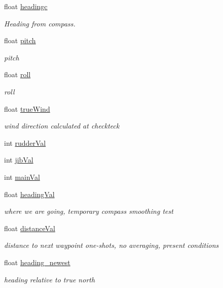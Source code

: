 \begin{DoxyCompactItemize}
float \hyperlink{group__group1_ga4736792191ccbbbb7b3d6933a3302336}{headingc}
\begin{DoxyCompactList}\small\item\em \-Heading from compass. \end{DoxyCompactList}\item 
float \hyperlink{group__group1_ga282e7d4378d4a18a805b8980295ac86c}{pitch}
\begin{DoxyCompactList}\small\item\em pitch \end{DoxyCompactList}\item 
float \hyperlink{group__group1_ga26fd84d522945b6038221d9e38c7cc39}{roll}
\begin{DoxyCompactList}\small\item\em roll \end{DoxyCompactList}\item 
float \hyperlink{group__group1_gaea221e98c9a7c4e63325dc52ab83c14d}{true\-Wind}
\begin{DoxyCompactList}\small\item\em wind direction calculated at checkteck \end{DoxyCompactList}\item 
int \hyperlink{group__group1_ga8b212bdc5d94214c0e3803a696f2f676}{rudder\-Val}
\item 
int \hyperlink{group__group1_ga1fee0a7eb4ae243dcc5afe20f508990e}{jib\-Val}
\item 
int \hyperlink{group__group1_ga3c5dac52b53dc3642a843a7d6a9266ca}{main\-Val}
\item 
float \hyperlink{group__group1_ga8d6cfa64e358c393d2d13c5a9803e052}{heading\-Val}
\begin{DoxyCompactList}\small\item\em where we are going, temporary compass smoothing test \end{DoxyCompactList}\item 
float \hyperlink{group__group1_ga90176c4024ce3ce161b5feda285f97c5}{distance\-Val}
\begin{DoxyCompactList}\small\item\em distance to next waypoint one-\/shots, no averaging, present conditions \end{DoxyCompactList}\item 
float \hyperlink{group__group1_ga3c596663ba52aec96df1f504772914be}{heading\-\_\-newest}
\begin{DoxyCompactList}\small\item\em heading relative to true north \end{DoxyCompactList}\item 

\end{DoxyCompactItemize}
